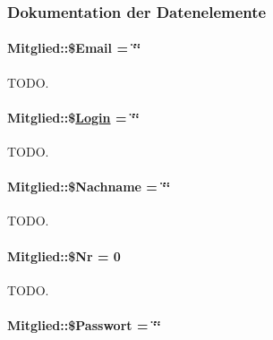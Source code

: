 \subsubsection{Dokumentation der Datenelemente}
\hypertarget{classMitglied_4be6b837c482ac912188663380d31122}{
\paragraph[\$Email]{\setlength{\rightskip}{0pt plus 5cm}Mitglied::\$Email = \char`\"{}\char`\"{}}\hfill}
\label{classMitglied_4be6b837c482ac912188663380d31122}


TODO. 

\hypertarget{classMitglied_626ee2f2551cc2840bdeac6a04491b2e}{
\paragraph[\$Login]{\setlength{\rightskip}{0pt plus 5cm}Mitglied::\$\hyperlink{classLogin}{Login} = \char`\"{}\char`\"{}}\hfill}
\label{classMitglied_626ee2f2551cc2840bdeac6a04491b2e}


TODO. 

\hypertarget{classMitglied_635def9ec266748689397299c7f79d9c}{
\paragraph[\$Nachname]{\setlength{\rightskip}{0pt plus 5cm}Mitglied::\$Nachname = \char`\"{}\char`\"{}}\hfill}
\label{classMitglied_635def9ec266748689397299c7f79d9c}


TODO. 

\hypertarget{classMitglied_113efe44273361b7c167c729666ad04c}{
\paragraph[\$Nr]{\setlength{\rightskip}{0pt plus 5cm}Mitglied::\$Nr = 0}\hfill}
\label{classMitglied_113efe44273361b7c167c729666ad04c}


TODO. 

\hypertarget{classMitglied_94f43b65c468ad42ac45be064d015446}{
\paragraph[\$Passwort]{\setlength{\rightskip}{0pt plus 5cm}Mitglied::\$Passwort = \char`\"{}\char`\"{}}\hfill}
\label{classMitglied_94f43b65c468ad42ac45be064d015446}


